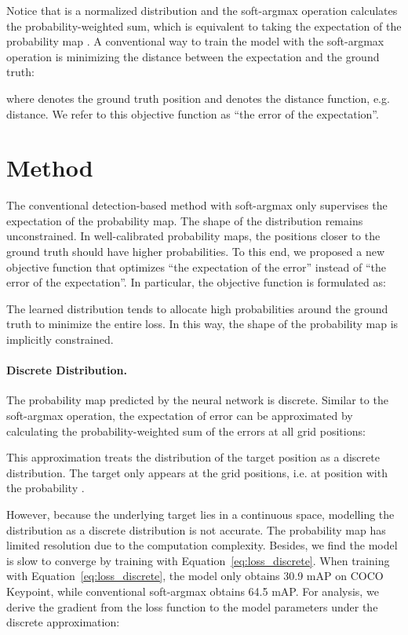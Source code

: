 \documentclass{article}
\begin{document}
Notice that  is a normalized distribution and the soft-argmax operation calculates the probability-weighted sum, which is equivalent to taking the expectation of the probability map . A conventional way to train the model with the soft-argmax operation is minimizing the distance between the expectation and the ground truth:

where  denotes the ground truth position and  denotes the distance function, e.g.  distance. We refer to this objective function as ``the error of the expectation''.

\section{Method}
The conventional detection-based method with soft-argmax only supervises the expectation of the probability map. The shape of the distribution remains unconstrained. In well-calibrated probability maps, the positions closer to the ground truth should have higher probabilities. To this end, we proposed a new objective function that optimizes ``the expectation of the error'' instead of ``the error of the expectation''. In particular, the objective function is formulated as:

The learned distribution tends to allocate high probabilities around the ground truth to minimize the entire loss. In this way, the shape of the probability map is implicitly constrained.


\paragraph{Discrete Distribution.}
The probability map  predicted by the neural network is discrete. Similar to the soft-argmax operation, the expectation of error can be approximated by calculating the probability-weighted sum of the errors at all grid positions:

This approximation treats the distribution of the target position as a discrete distribution. The target only appears at the grid positions, i.e. at position  with the probability .



However, because the underlying target lies in a continuous space, modelling the distribution as a discrete distribution is not accurate. The probability map has limited resolution due to the computation complexity. Besides, we find the model is slow to converge by training with Equation~\ref{eq:loss_discrete}. When training with Equation~\ref{eq:loss_discrete}, the model only obtains 30.9 mAP on COCO Keypoint, while conventional soft-argmax obtains 64.5 mAP. For analysis, we derive the gradient from the loss function to the model parameters  under the discrete approximation:
\end{document}
